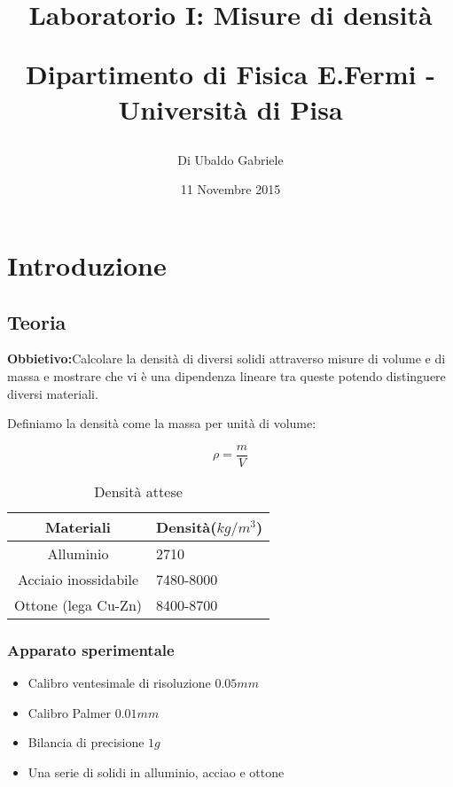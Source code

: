 \documentclass[a4paper,10pt]{article}
\title{Laboratorio I: Misure di densità\\
\begin{large}
Dipartimento di Fisica E.Fermi - Università di Pisa
\end{large}}
\author{Di Ubaldo Gabriele}
\date{11 Novembre 2015}
\begin{document}
\maketitle


\section{Introduzione}
\subsection{Teoria}
\textbf{Obbietivo:}Calcolare la densità di diversi solidi attraverso misure di volume e di massa e mostrare che vi è una dipendenza lineare tra queste potendo distinguere diversi materiali.

Definiamo la densità come la massa per unità di volume:

 \begin{equation}
    \rho=\frac{m}{V}
 \end{equation}

\begin{table}[!htb]
\centering
\caption{Densità attese}
\label{my-label}
\begin{tabular}{c|c|c}
\hline
Materiali            & \multicolumn{2}{l|}{Densità($kg/m^3$)} \\ \hline
Alluminio            & \multicolumn{2}{l|}{2710}                            \\ \hline
Acciaio inossidabile & \multicolumn{2}{l|}{7480-8000}                       \\ \hline
Ottone (lega Cu-Zn)  & \multicolumn{2}{l|}{8400-8700}                       \\ 



\end{tabular}
\end{table}


\subsubsection{Apparato sperimentale}
\begin{itemize}
 \item {Calibro ventesimale di risoluzione $0.05mm$}
 \item {Calibro Palmer $0.01mm$}
 \item {Bilancia di precisione $1g$}
 \item {Una serie di solidi in alluminio, acciao e ottone} 
\end{itemize}
\end{document}
